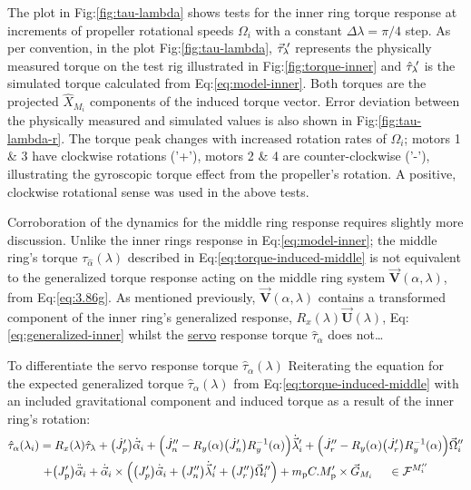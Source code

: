 \par
The plot in Fig:\ref{fig:tau-lambda} shows tests for the inner ring torque response at increments of propeller rotational speeds $\Omega_i$ with a constant $\Delta\lambda=\pi/4$ step. As per convention, in the plot Fig:\ref{fig:tau-lambda}, $\vec{\tau}_\lambda\text{}\hspace{-2pt}'$ represents the physically measured torque on the test rig illustrated in Fig:\ref{fig:torque-inner} and $\hat{\tau}_\lambda\text{}\hspace{-2pt}'$ is the simulated torque calculated from Eq:\ref{eq:model-inner}. Both torques are the projected $\hat{X}_{M_i}$ components of the induced torque vector. Error deviation between the physically measured and simulated values is also shown in Fig:\ref{fig:tau-lambda-r}. The torque peak changes with increased rotation rates of $\Omega_i$; motors 1 \& 3 have clockwise rotations ('+'), motors 2 \& 4 are counter-clockwise ('-'), illustrating the gyroscopic torque effect from the propeller's rotation. A positive, clockwise rotational sense was used in the above tests. 
\par
Corroboration of the dynamics for the middle ring response requires slightly more discussion. Unlike the inner rings response in Eq:\ref{eq:model-inner}; the middle ring's torque $\tau_\hat{\alpha}(\lambda)$ described in Eq:\ref{eq:torque-induced-middle} is not equivalent to the generalized torque response acting on the middle ring system $\vec{\mathbf{V}}(\alpha,\lambda)$, from Eq:\ref{eq:3.86g}. As mentioned previously, $\vec{\mathbf{V}}(\alpha,\lambda)$ contains a transformed component of the inner ring's generalized response, $R_x(\lambda)\vec{\mathbf{U}}(\lambda)$, Eq:\ref{eq:generalized-inner} whilst the \underline{servo} response torque $\hat{\tau}_\alpha$ does not\ldots 
\par
To differentiate the servo response torque $\hat{\tau}_\alpha(\lambda)$ 
Reiterating the equation for the expected generalized torque $\hat{\tau}_\alpha(\lambda)$ from Eq:\ref{eq:torque-induced-middle} with an included gravitational component and induced torque as a result of the inner ring's rotation:
\begin{multline} \label{eq:model-middle}
\hat{\tau}_\alpha(\lambda_i)=R_x(\lambda)\hat{\tau}_\lambda+\big(\dot{J}_p'\big)\dot{\vec{\alpha}}_i+\Big(\dot{J}_n''-R_y(\alpha)\big(\dot{J}_n'\big)R_y^{-1}(\alpha)\Big)\dot{\vec{\lambda}}_i'+\Big(\dot{J}_r''-R_y(\alpha)\big(\dot{J}_r'\big)R_y^{-1}(\alpha)\Big)\vec{\Omega}_i''
\\
+\big(J_\text{p}'\big)\ddot{\vec{\alpha}}_i+\dot{\vec{\alpha}}_i\times \Big(\big(J_p'\big)\dot{\vec{\alpha}}_i+\big(J_n''\big)\dot{\vec{\lambda}}_i\hspace{-2pt}'+\big(J_r''\big)\vec{\Omega}_i\hspace{-2pt}''\Big)+m_\text{p}C.M'_{\text{p}}\times\vec{G}_{M_i}~~~~\in\mathcal{F}^{M_i''}
\end{multline}
